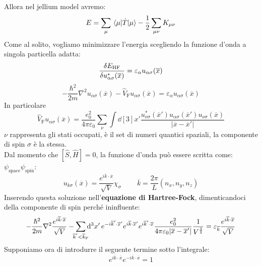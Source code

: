 Allora nel jellium model avremo:
\begin{equation*}
    E=\sum_{\mu}\mel{\mu}{\hat T}{\mu}-\frac 12 \sum_{\mu\nu}K_{\mu\nu}
\end{equation*}
Come al solito, vogliamo minimizzare l'energia scegliendo la funzione d'onda a singola particella adatta:
\begin{equation*}
    \functionalderivative{E_\text{HF}}{u_{\alpha\sigma}^*(\overline x)}=\varepsilon_\alpha u_{\alpha\sigma}(\overline x)
\end{equation*}
\begin{equation*}
    -\frac{\hbar^2}{2m}\nabla^2u_{\alpha\sigma}(\overline x)-\hat V_{\text{F}}u_{\alpha\sigma}(\overline x)=\varepsilon_\alpha u_{\alpha\sigma}(\overline x)
\end{equation*}
In particolare
\begin{equation*}
    \hat V_{\text{F}}u_{\alpha\sigma}(\overline x)=\frac{e_0^2}{4\pi\varepsilon_0}\sum_\nu\int\dd[3]{x'}\frac{u_{\nu\sigma}^*(\overline{x}')u_{\alpha\sigma}(\overline{x}')u_{\nu\sigma}(\overline{x})}{|\overline{x}-\overline{x}'|}
\end{equation*}
$\nu$ rappresenta gli stati occupati, è il set di numeri quantici spaziali, la componente di spin $\sigma$ è la stessa. \\
Dal momento che $[\hat S, \hat H]=0$, la funzione d'onda può essere scritta come: $\psi_{\text{space}}\psi_{\text{spin}}$:
\begin{equation*}
    u_{k\sigma}(\overline x)=\frac{e^{i\overline{k}\cdot\overline{x}}}{\sqrt V}\chi_\sigma \ \ \ \ \ \ \ \ \ \ \overline k=\frac{2\pi}{L}(n_x,n_y,n_z)
\end{equation*}
Inserendo questa soluzione nell'\textbf{equazione di Hartree-Fock}, dimenticandoci della componente di spin perché ininfluente:
\begin{equation*}
    -\frac{\hbar^2}{2m}\nabla^2\frac{e^{i\overline{k}\cdot\overline{x}}}{\sqrt V}-\sum_{\mathclap{\overline{k}'<\overline{k}_\text{F}}}\dd[3]{x'}e^{-i\overline{k}'\cdot\overline{x}'}e^{i\overline{k}\cdot\overline{x}'}e^{i\overline{k}'\cdot\overline{x}}\frac{e_0^2}{4\pi\varepsilon_0|\overline{x}-\overline{x}'|}\frac{1}{V^{\frac 32}}=\varepsilon_{\overline k}\frac{e^{i\overline{k}\cdot\overline{x}}}{\sqrt V}
\end{equation*}
Supponiamo ora di introdurre il seguente termine sotto l'integrale:
\begin{equation*}
    e^{i\overline{k}\cdot\overline{x}}e^{-i\overline{k}\cdot\overline{x}}=1
\end{equation*}

